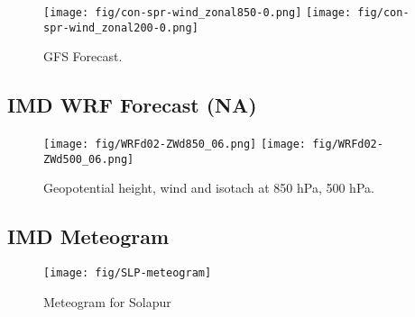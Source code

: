 \documentclass[12pt,a4paper]{article} %
\begin{document}
\begin{figure}[H]
\centering
\texttt{[image: fig/con-spr-wind\_zonal850-0.png]}
\texttt{[image: fig/con-spr-wind\_zonal200-0.png]}
\caption{GFS Forecast.}
\end{figure}


\subsection*{IMD WRF Forecast (NA)}

\begin{figure}[H]
\centering
\texttt{[image: fig/WRFd02-ZWd850\_06.png]}
\texttt{[image: fig/WRFd02-ZWd500\_06.png]}
\caption{Geopotential height, wind and isotach at 850 hPa, 500 hPa.}
\end{figure}







%




\subsection*{IMD Meteogram}
\begin{figure}[H]
\centering
\texttt{[image: fig/SLP-meteogram]}
\caption{Meteogram for Solapur}
\end{figure}
\end{document}

